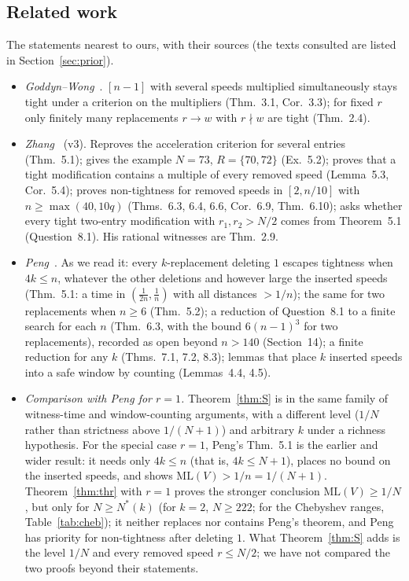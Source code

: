 \documentclass[11pt]{article}
\theoremstyle{definition}
\theoremstyle{remark}
\newcommand{\ML}{\mathrm{ML}}
\begin{document}
\subsection{Related work}
The statements nearest to ours, with their sources (the texts consulted are listed in Section~\ref{sec:prior}).
\begin{itemize}[nosep]
\item \emph{Goddyn--Wong}~\cite{GW}. $[n-1]$ with several speeds multiplied simultaneously stays tight under a criterion on the multipliers (Thm.~3.1, Cor.~3.3); for fixed $r$ only finitely many replacements $r\to w$ with $r\nmid w$ are tight (Thm.~2.4).
\item \emph{Zhang}~\cite{Z} (v3). Reproves the acceleration criterion for several entries (Thm.~5.1); gives the example $N=73$, $R=\{70,72\}$ (Ex.~5.2); proves that a tight modification contains a multiple of every removed speed (Lemma~5.3, Cor.~5.4); proves non-tightness for removed speeds in $[2,n/10]$ with $n\ge\max(40,10q)$ (Thms.~6.3, 6.4, 6.6, Cor.~6.9, Thm.~6.10); asks whether every tight two-entry modification with $r_1,r_2>N/2$ comes from Theorem~5.1 (Question~8.1). His rational witnesses are Thm.~2.9.
\item \emph{Peng}~\cite{P}. As we read it: every $k$-replacement deleting $1$ escapes tightness when $4k\le n$, whatever the other deletions and however large the inserted speeds (Thm.~5.1: a time in $(\frac1{2n},\frac1n)$ with all distances $>1/n$); the same for two replacements when $n\ge6$ (Thm.~5.2); a reduction of Question~8.1 to a finite search for each $n$ (Thm.~6.3, with the bound $6(n-1)^3$ for two replacements), recorded as open beyond $n>140$ (Section~14); a finite reduction for any $k$ (Thms.~7.1, 7.2, 8.3); lemmas that place $k$ inserted speeds into a safe window by counting (Lemmas~4.4, 4.5).
\item \emph{Comparison with Peng for $r=1$.} Theorem~\ref{thm:S} is in the same family of witness-time and window-counting arguments, with a different level ($1/N$ rather than strictness above $1/(N+1)$) and arbitrary $k$ under a richness hypothesis. For the special case $r=1$, Peng's Thm.~5.1 is the earlier and wider result: it needs only $4k\le n$ (that is, $4k\le N+1$), places no bound on the inserted speeds, and shows $\ML(V)>1/n=1/(N+1)$. Theorem~\ref{thm:thr} with $r=1$ proves the stronger conclusion $\ML(V)\ge1/N$, but only for $N\ge N^*(k)$ (for $k=2$, $N\ge222$; for the Chebyshev ranges, Table~\ref{tab:cheb}); it neither replaces nor contains Peng's theorem, and Peng has priority for non-tightness after deleting $1$. What Theorem~\ref{thm:S} adds is the level $1/N$ and every removed speed $r\le N/2$; we have not compared the two proofs beyond their statements.

\end{itemize}
\end{document}
